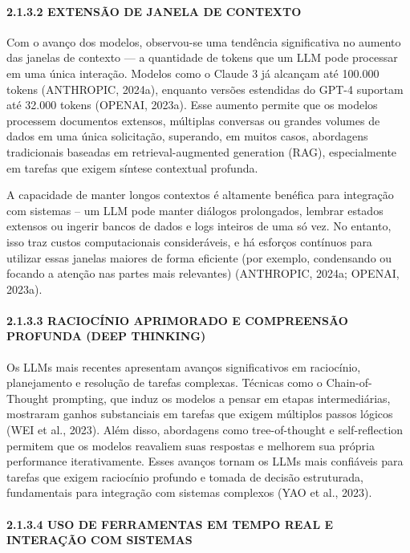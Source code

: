 \documentclass[
]{article}
\begin{document}
\paragraph{2.1.3.2 EXTENSÃO DE JANELA DE
CONTEXTO}\label{extensuxe3o-de-janela-de-contexto}

Com o avanço dos modelos, observou-se uma tendência significativa no
aumento das janelas de contexto --- a quantidade de tokens que um LLM
pode processar em uma única interação. Modelos como o Claude 3 já
alcançam até 100.000 tokens (ANTHROPIC, 2024a), enquanto versões
estendidas do GPT-4 suportam até 32.000 tokens (OPENAI, 2023a). Esse
aumento permite que os modelos processem documentos extensos, múltiplas
conversas ou grandes volumes de dados em uma única solicitação,
superando, em muitos casos, abordagens tradicionais baseadas em
retrieval-augmented generation (RAG), especialmente em tarefas que
exigem síntese contextual profunda.

A capacidade de manter longos contextos é altamente benéfica para
integração com sistemas -- um LLM pode manter diálogos prolongados,
lembrar estados extensos ou ingerir bancos de dados e logs inteiros de
uma só vez. No entanto, isso traz custos computacionais consideráveis, e
há esforços contínuos para utilizar essas janelas maiores de forma
eficiente (por exemplo, condensando ou focando a atenção nas partes mais
relevantes) (ANTHROPIC, 2024a; OPENAI, 2023a).

\paragraph{2.1.3.3 RACIOCÍNIO APRIMORADO E COMPREENSÃO PROFUNDA (DEEP
THINKING)}\label{raciocuxednio-aprimorado-e-compreensuxe3o-profunda-deep-thinking}

Os LLMs mais recentes apresentam avanços significativos em raciocínio,
planejamento e resolução de tarefas complexas. Técnicas como o
Chain-of-Thought prompting, que induz os modelos a pensar em etapas
intermediárias, mostraram ganhos substanciais em tarefas que exigem
múltiplos passos lógicos (WEI et al., 2023). Além disso, abordagens como
tree-of-thought e self-reflection permitem que os modelos reavaliem suas
respostas e melhorem sua própria performance iterativamente. Esses
avanços tornam os LLMs mais confiáveis para tarefas que exigem
raciocínio profundo e tomada de decisão estruturada, fundamentais para
integração com sistemas complexos (YAO et al., 2023).

\paragraph{2.1.3.4 USO DE FERRAMENTAS EM TEMPO REAL E INTERAÇÃO COM
SISTEMAS}\label{uso-de-ferramentas-em-tempo-real-e-interauxe7uxe3o-com-sistemas}
\end{document}

